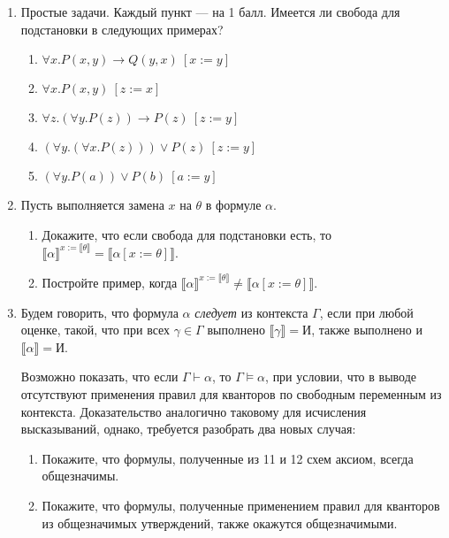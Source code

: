 \documentclass[10pt,a4paper,oneside]{article}
\begin{document}
\begin{enumerate}
\item Простые задачи. Каждый пункт --- на 1 балл. Имеется ли свобода для подстановки в следующих примерах?
\begin{enumerate}
\item $\forall x.P(x,y) \rightarrow Q(y,x)\ [ x := y ]$
\item $\forall x.P(x,y)\ [ z := x ]$
\item $\forall z.(\forall y.P(z)) \rightarrow P(z)\ [ z:= y]$
\item $(\forall y.(\forall x.P(z))) \vee P(z)\ [ z:= y ]$
\item $(\forall y.P(a)) \vee P(b)\ [a := y]$
\end{enumerate}

\item 
Пусть выполняется замена $x$ на $\theta$ в формуле $\alpha$. 

\begin{enumerate}
\item
Докажите, что если свобода для подстановки есть, 
то $\llbracket \alpha \rrbracket ^{x := \llbracket\theta\rrbracket} = \llbracket\alpha[x := \theta]\rrbracket$.

\item Постройте пример, когда 
$\llbracket \alpha \rrbracket ^{x := \llbracket\theta\rrbracket} \ne \llbracket\alpha[x := \theta]\rrbracket$.
\end{enumerate}

\item Будем говорить, что формула $\alpha$ \emph{следует} из контекста $\Gamma$, 
если при любой оценке, такой, что при всех $\gamma\in\Gamma$ выполнено $\llbracket\gamma\rrbracket = \text{И}$, 
также выполнено и $\llbracket\alpha\rrbracket=\text{И}$.

Возможно показать, что если $\Gamma \vdash \alpha$, то $\Gamma \models \alpha$, при условии, что в выводе 
отсутствуют применения правил для кванторов по свободным переменным из контекста.
Доказательство аналогично таковому для исчисления высказываний, однако, требуется разобрать два новых случая:

\begin{enumerate}
\item Покажите, что формулы, полученные из 11 и 12 схем аксиом, всегда общезначимы.
\item Покажите, что формулы, полученные применением правил для кванторов из общезначимых утверждений, также окажутся
общезначимыми.
\end{enumerate}


\end{enumerate}
\end{document}

